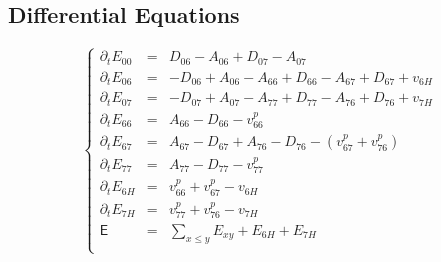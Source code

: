 \documentclass[aps,onecolumn,11pt]{revtex4}
\begin{document}
\subsection{Differential Equations}
\begin{equation}
\left\lbrace
\begin{array}{rcl}
\partial_t E_{00} & = & D_{06}-A_{06} + D_{07}-A_{07}\\
\partial_t E_{06} & = & -D_{06}+A_{06} - A_{66} + D_{66} - A_{67} + D_{67} + v_{6H}\\
\partial_t E_{07} & = & -D_{07}+A_{07} - A_{77} + D_{77} - A_{76} + D_{76} + v_{7H}\\
\partial_t E_{66} & = & A_{66}-D_{66} -v^p_{66}\\
\partial_t E_{67} & = & A_{67}-D_{67} + A_{76}-D_{76} - (v^p_{67}+v^p_{76})\\
\partial_t E_{77} & = & A_{77}-D_{77} - v^p_{77}\\
\partial_t E_{6H} & = & v^p_{66}+v^p_{67} - v_{6H}\\
\partial_t E_{7H} & = & v^p_{77}+v^p_{76} - v_{7H}\\
\mathsf{E}      & = & {\displaystyle \sum_{x\leq y} E_{xy}}+E_{6H}+E_{7H}\\
\end{array}
\right.
\end{equation}
\end{document}
